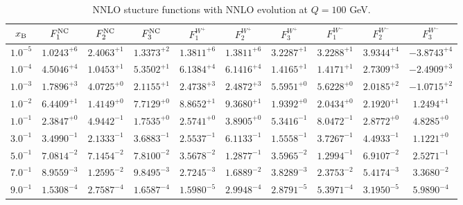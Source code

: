 \begin{table}[h]
\begin{adjustbox}{width=\textwidth}
\begin{tabular}{|c||c|c|c|c|c|c|c|c|c|}
\hline
$x_{\rm B}$ & $F_1^{\rm NC}$ & $F_2^{\rm NC}$ & $F_3^{\rm NC}$ & $F_1^{W^+}$ & $F_2^{W^+}$ & $F_3^{W^+}$ & $F_1^{W^-}$ & $F_2^{W^-}$ & $F_3^{W^-}$ \\
\hline
$ 1.0^{-5}$ & $ 1.0243^{+6}$ & $ 2.4063^{+1}$ & $ 1.3373^{+2}$ & $ 1.3811^{+6}$ & $ 1.3811^{+6}$ & $ 3.2287^{+1}$ & $ 3.2288^{+1}$ & $ 3.9344^{+4}$ & $-3.8743^{+4}$ \\
$ 1.0^{-4}$ & $ 4.5046^{+4}$ & $ 1.0453^{+1}$ & $ 5.3502^{+1}$ & $ 6.1384^{+4}$ & $ 6.1416^{+4}$ & $ 1.4165^{+1}$ & $ 1.4171^{+1}$ & $ 2.7309^{+3}$ & $-2.4909^{+3}$ \\
$ 1.0^{-3}$ & $ 1.7896^{+3}$ & $ 4.0725^{+0}$ & $ 2.1155^{+1}$ & $ 2.4738^{+3}$ & $ 2.4872^{+3}$ & $ 5.5951^{+0}$ & $ 5.6228^{+0}$ & $ 2.0185^{+2}$ & $-1.0715^{+2}$ \\
$ 1.0^{-2}$ & $ 6.4409^{+1}$ & $ 1.4149^{+0}$ & $ 7.7129^{+0}$ & $ 8.8652^{+1}$ & $ 9.3680^{+1}$ & $ 1.9392^{+0}$ & $ 2.0434^{+0}$ & $ 2.1920^{+1}$ & $ 1.2494^{+1}$ \\
$ 1.0^{-1}$ & $ 2.3847^{+0}$ & $ 4.9442^{-1}$ & $ 1.7535^{+0}$ & $ 2.5741^{+0}$ & $ 3.8905^{+0}$ & $ 5.3416^{-1}$ & $ 8.0472^{-1}$ & $ 2.8772^{+0}$ & $ 4.8285^{+0}$ \\
$ 3.0^{-1}$ & $ 3.4990^{-1}$ & $ 2.1333^{-1}$ & $ 3.6883^{-1}$ & $ 2.5537^{-1}$ & $ 6.1133^{-1}$ & $ 1.5558^{-1}$ & $ 3.7267^{-1}$ & $ 4.4933^{-1}$ & $ 1.1221^{+0}$ \\
$ 5.0^{-1}$ & $ 7.0814^{-2}$ & $ 7.1454^{-2}$ & $ 7.8100^{-2}$ & $ 3.5678^{-2}$ & $ 1.2877^{-1}$ & $ 3.5965^{-2}$ & $ 1.2994^{-1}$ & $ 6.9107^{-2}$ & $ 2.5271^{-1}$ \\
$ 7.0^{-1}$ & $ 8.9559^{-3}$ & $ 1.2595^{-2}$ & $ 9.8495^{-3}$ & $ 2.7245^{-3}$ & $ 1.6889^{-2}$ & $ 3.8289^{-3}$ & $ 2.3753^{-2}$ & $ 5.4174^{-3}$ & $ 3.3680^{-2}$ \\
$ 9.0^{-1}$ & $ 1.5308^{-4}$ & $ 2.7587^{-4}$ & $ 1.6587^{-4}$ & $ 1.5980^{-5}$ & $ 2.9948^{-4}$ & $ 2.8791^{-5}$ & $ 5.3971^{-4}$ & $ 3.1950^{-5}$ & $ 5.9890^{-4}$ \\
\hline
\end{tabular}
\end{adjustbox}\caption{NNLO stucture functions with NNLO evolution at $Q = 100$ GeV.}
\label{tab:N2LO-Q100}
\end{table}



